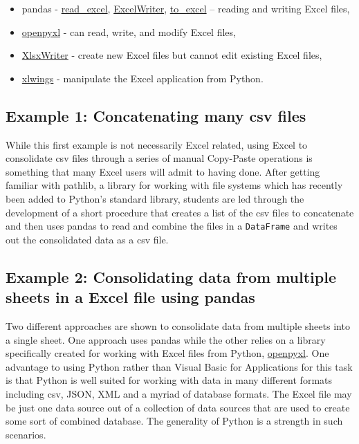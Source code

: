 \documentclass[ited,blindrev]{informs3}              %
\newcommand{\code}[1]{\texttt{#1}}
\begin{document}
\begin{itemize}
	\item
	pandas -
	\href{https://pandas.pydata.org/docs/reference/api/pandas.read_excel.html}{read\_excel},
	\href{https://pandas.pydata.org/docs/reference/api/pandas.ExcelWriter.html}{ExcelWriter},
	\href{https://pandas.pydata.org/docs/reference/api/pandas.DataFrame.to_excel.html}{to\_excel} -- reading and writing Excel files,
	\item
	\href{https://openpyxl.readthedocs.io/en/stable/}{openpyxl} - can
	read, write, and modify Excel files,
	\item
	\href{https://xlsxwriter.readthedocs.io/}{XlsxWriter} - create new Excel files but
	cannot edit existing Excel files,
	\item
	\href{https://www.xlwings.org/}{xlwings} - manipulate the Excel application from Python.
\end{itemize}


\subsection{Example 1: Concatenating many csv files}

While this first example is not necessarily Excel related, using Excel to consolidate csv files through a series of manual Copy-Paste operations is something that many Excel users will admit to having done. After getting familiar with pathlib, a library for working with file systems which has recently been added to Python's standard library, students are led through the development of a short procedure that creates a list of the csv files to concatenate and then uses pandas to read and combine the files in a \code{DataFrame} and writes out the consolidated data as a csv file.

\subsection{Example 2: Consolidating data from multiple sheets in a Excel file using pandas}

Two different approaches are shown to consolidate data from multiple sheets into a single sheet. One approach uses pandas while the other relies on a library specifically created for working with Excel files from Python, \href{https://openpyxl.readthedocs.io/en/stable/}{openpyxl}. One advantage to using Python rather than Visual Basic for Applications for this task is that Python is well suited for working with data in many different formats including csv, JSON, XML and a myriad of database formats. The Excel file may be just one data source out of a collection of data sources that are used to create some sort of combined database. The generality of Python is a strength in such scenarios.
\end{document}

